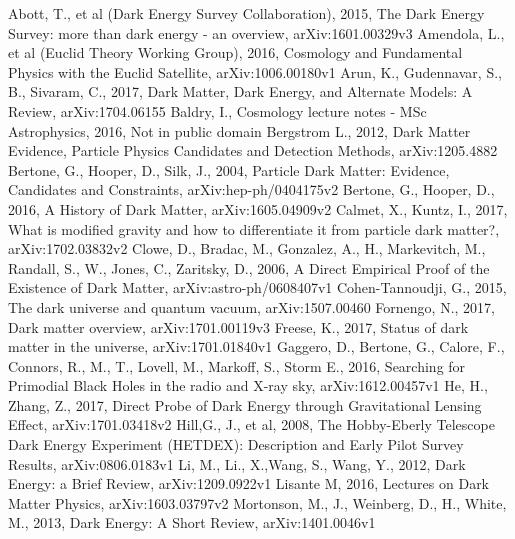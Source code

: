 \documentclass[a4paper,12pt]{article}
\begin{document}
\begin{thebibliography}{1}
Abott, T., et al (Dark Energy Survey Collaboration), 2015, The Dark Energy Survey: more than dark energy - an overview, arXiv:1601.00329v3
Amendola, L., et al (Euclid Theory Working Group), 2016, Cosmology and Fundamental Physics with the Euclid Satellite, arXiv:1006.00180v1
Arun, K., Gudennavar, S., B., Sivaram, C., 2017, Dark Matter, Dark Energy, and Alternate Models: A Review, arXiv:1704.06155
Baldry, I., Cosmology lecture notes - MSc Astrophysics, 2016, Not in public domain
Bergstrom L., 2012,  Dark Matter Evidence, Particle Physics Candidates and Detection Methods, arXiv:1205.4882
Bertone, G., Hooper, D., Silk, J., 2004, Particle Dark Matter: Evidence, Candidates and Constraints, arXiv:hep-ph/0404175v2
Bertone, G., Hooper, D., 2016, A History of Dark Matter, arXiv:1605.04909v2
Calmet, X., Kuntz, I., 2017, What is modified gravity and how to differentiate it from particle dark matter?, arXiv:1702.03832v2
Clowe, D., Bradac, M., Gonzalez, A., H., Markevitch, M., Randall, S., W., Jones, C., Zaritsky, D., 2006, A Direct Empirical Proof of the Existence of Dark Matter, arXiv:astro-ph/0608407v1
Cohen-Tannoudji, G., 2015, The dark universe and quantum vacuum, arXiv:1507.00460
Fornengo, N., 2017, Dark matter overview, arXiv:1701.00119v3
Freese, K., 2017, Status of dark matter in the universe, arXiv:1701.01840v1
Gaggero, D., Bertone, G., Calore, F., Connors, R., M., T., Lovell, M., Markoff, S., Storm E., 2016, Searching for Primodial Black Holes in the radio and X-ray sky, arXiv:1612.00457v1
He, H., Zhang, Z., 2017, Direct Probe of Dark Energy through Gravitational Lensing Effect, arXiv:1701.03418v2
Hill,G., J., et al, 2008, The Hobby-Eberly Telescope Dark Energy Experiment (HETDEX): Description and Early Pilot Survey Results, arXiv:0806.0183v1
Li, M., Li., X.,Wang, S., Wang, Y., 2012, Dark Energy: a Brief Review, arXiv:1209.0922v1
Lisante M, 2016, Lectures on Dark Matter Physics, arXiv:1603.03797v2
Mortonson, M., J., Weinberg, D., H., White, M., 2013, Dark Energy: A Short Review, arXiv:1401.0046v1

\end{thebibliography}
\end{document}
